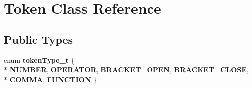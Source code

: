 \hypertarget{class_token}{\section{Token Class Reference}
\label{class_token}
}
\subsection*{Public Types}
\begin{DoxyCompactItemize}
\item 
enum {\bfseries token\-Type\-\_\-t} \{ \\*
{\bfseries N\-U\-M\-B\-E\-R}, 
{\bfseries O\-P\-E\-R\-A\-T\-O\-R}, 
{\bfseries B\-R\-A\-C\-K\-E\-T\-\_\-\-O\-P\-E\-N}, 
{\bfseries B\-R\-A\-C\-K\-E\-T\-\_\-\-C\-L\-O\-S\-E}, 
\\*
{\bfseries C\-O\-M\-M\-A}, 
{\bfseries F\-U\-N\-C\-T\-I\-O\-N}
 \}
\end{DoxyCompactItemize}
